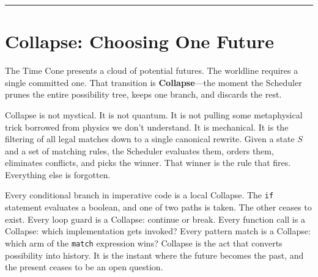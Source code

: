 \begin{center}
\rule{0.5\linewidth}{0.5pt}
\end{center}

\section{Collapse: Choosing One Future}
\label{6.5-collapse}

The Time Cone presents a cloud of potential futures. The worldline requires a single committed one.
That transition is \textbf{Collapse}—the moment the Scheduler prunes the entire possibility tree,
keeps one branch, and discards the rest.

Collapse is not mystical. It is not quantum. It is not pulling some metaphysical trick borrowed from
physics we don't understand. It is mechanical. It is the filtering of all legal matches down to a
single canonical rewrite. Given a state $S$ and a set of matching rules, the Scheduler evaluates
them, orders them, eliminates conflicts, and picks the winner. That winner is the rule that fires.
Everything else is forgotten.

Every conditional branch in imperative code is a local Collapse. The \texttt{if} statement evaluates
a boolean, and one of two paths is taken. The other ceases to exist. Every loop guard is a Collapse:
continue or break. Every function call is a Collapse: which implementation gets invoked? Every
pattern match is a Collapse: which arm of the \texttt{match} expression wins? Collapse is the act
that converts possibility into history. It is the instant where the future becomes the past, and the
present ceases to be an open question.

